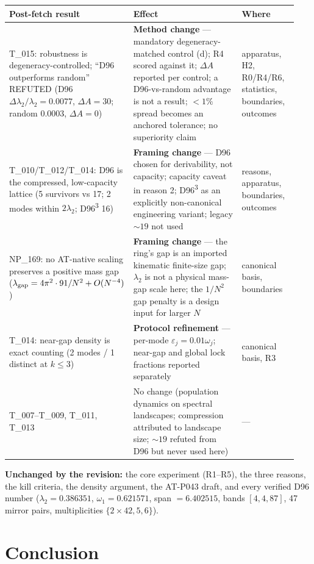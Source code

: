 \documentclass[11pt,a4paper]{article}
\newcommand{\ls}[1]{\ensuremath{\lambda_{#1}}}
\newcommand{\w}[1]{\ensuremath{\omega_{#1}}}
\begin{document}
\begin{table}[h]
\centering
\small
\begin{tabular}{@{}p{0.30\linewidth}p{0.44\linewidth}p{0.20\linewidth}@{}}
\toprule
Post-fetch result & Effect & Where \\
\midrule
T\_015: robustness is degeneracy-controlled; ``D96 outperforms random'' REFUTED
(D96 $\Delta\ls{2}/\ls{2}=0.0077$, $\Delta A=30$; random $0.0003$, $\Delta A=0$)
& \textbf{Method change} --- mandatory degeneracy-matched control (d); R4 scored against it;
$\Delta A$ reported per control; a D96-vs-random advantage is not a result; $<1\%$ spread becomes an
anchored tolerance; no superiority claim & apparatus, H2, R0/R4/R6, statistics, boundaries,
outcomes \\
T\_010/T\_012/T\_014: D96 is the compressed, low-capacity lattice (5 survivors vs 17; 2 modes within
$2\ls{2}$; D96\textsuperscript{3} 16) & \textbf{Framing change} --- D96 chosen for derivability, not
capacity; capacity caveat in reason 2; D96\textsuperscript{3} as an explicitly non-canonical
engineering variant; legacy ${\sim}19$ not used & reasons, apparatus, boundaries, outcomes \\
NP\_169: no AT-native scaling preserves a positive mass gap
($\lambda_{\rm gap}=4\pi^2\cdot91/N^2+O(N^{-4})$) & \textbf{Framing change} --- the ring's gap is an
imported kinematic finite-size gap; $\ls{2}$ is not a physical mass-gap scale here; the $1/N^2$ gap
penalty is a design input for larger $N$ & canonical basis, boundaries \\
T\_014: near-gap density is exact counting (2 modes / 1 distinct at $k\le3$) & \textbf{Protocol
refinement} --- per-mode $\varepsilon_j=0.01\w{j}$; near-gap and global lock fractions reported
separately & canonical basis, R3 \\
T\_007--T\_009, T\_011, T\_013 & No change (population dynamics on spectral landscapes; compression
attributed to landscape size; ${\sim}19$ refuted from D96 but never used here) & --- \\
\bottomrule
\end{tabular}
\end{table}

\noindent\textbf{Unchanged by the revision:} the core experiment (R1--R5), the three reasons, the
kill criteria, the density argument, the AT-P043 draft, and every verified D96 number
($\ls{2}=0.386351$, $\w{1}=0.621571$, span $=6.402515$, bands $[4,4,87]$, 47 mirror pairs,
multiplicities $\{2\times42,5,6\}$).

\section{Conclusion}
\end{document}
